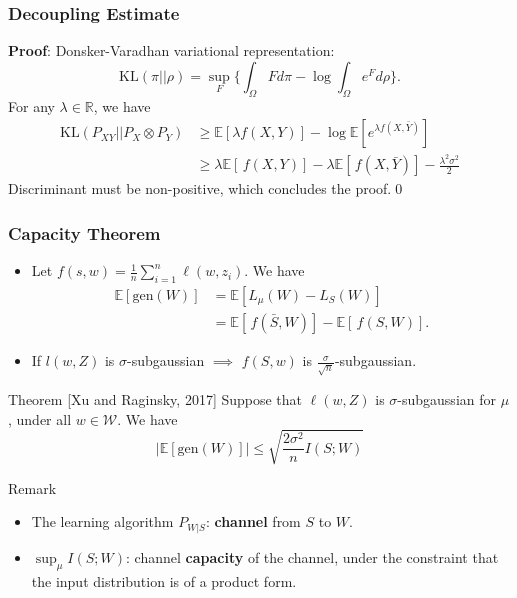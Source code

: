 \documentclass[usenames,dvipsnames, 10pt]{beamer}
\newcommand{\R}{\mathbb{R}}
\newcommand{\E}{\mathbb{E}}
\begin{document}
\begin{frame}
	\frametitle{Decoupling Estimate}
	\textbf{Proof}: Donsker-Varadhan variational representation: 
	\vspace{-0.2cm}		
	\begin{equation*}
	\mathrm{KL}(\pi||\rho) = \sup_F \Big\{\int_\Omega F d\pi - \log\int_\Omega e^F d\rho\Big\}.
	\end{equation*} 
	\pause
	\vspace{-0.2cm}		
	For any $\lambda \in \R$, we have
	\begin{align*}
	\mathrm{KL}(P_{XY}||P_X\otimes P_Y) &\geq \E[\lambda f(X, Y)] - \log \E[e^{\lambda f( X, \bar Y)}]\\
	&\geq \lambda\E[\,f(X, Y)] - \lambda\E[\,f( X, \bar Y)] - \frac{\lambda^2\sigma^2}{2}
	\end{align*}	
	\pause
	Discriminant must be non-positive, which concludes the proof.\qed
\end{frame}

\begin{frame}
	\frametitle{Capacity Theorem}
	
	\begin{itemize}
		\item Let $f(s, w) = \frac{1}{n} \sum_{i = 1}^{n} \ell(w, z_i)$. \pause  We have
		\vspace{-0.1cm}
		\begin{align*}
		\E [\mathrm{gen}(W)] &= \E[L_\mu(W) - L_S(W)]\\ 
		&= \E[\,f(\bar S,  W)] - \E[\,f( S,  W)].
		\end{align*}
		\pause
		\vspace{-0.5cm}
		\item If $l(w, Z)$ is $\sigma$-subgaussian $\implies$ $f(S, w)$ is $\frac{\sigma}{\sqrt{n}}$-subgaussian.
	\end{itemize}
	
	\vspace{-0.1cm}
	\pause
	\begin{block}{Theorem {\scriptsize [Xu and Raginsky,  2017]}}
		Suppose that $\ell(w, Z)$ is $\sigma$-subgaussian for $\mu$, under all $w\in\mathcal{W}$. We have
		\vspace{-0.2cm}
		\begin{equation*}
			|\E [\mathrm{gen}(W)]| \leq \sqrt{\frac{2\sigma^2}{n} I(S;W)}
		\end{equation*}
		\vspace{-0.4cm}
	\end{block}
	\pause	
	\begin{alertblock}{Remark}
		\begin{itemize}
			\item The learning algorithm
			$P_{W|S}$: \textbf{channel} from $S$ to ${W}$.
			
			\item $\sup_{\mu} I(S; W)$:		
			channel \textbf{capacity} of the channel, under the constraint that the input distribution is of a product form.
			
		\end{itemize}			
	\end{alertblock}	
\end{frame}
\end{document}

